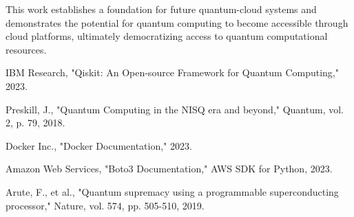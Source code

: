 \documentclass[conference]{IEEEtran}
\begin{document}
This work establishes a foundation for future quantum-cloud systems and demonstrates the potential for quantum computing to become accessible through cloud platforms, ultimately democratizing access to quantum computational resources.



\begin{thebibliography}{9}

IBM Research, "Qiskit: An Open-source Framework for Quantum Computing," 2023.

Preskill, J., "Quantum Computing in the NISQ era and beyond," Quantum, vol. 2, p. 79, 2018.

Docker Inc., "Docker Documentation," 2023.

Amazon Web Services, "Boto3 Documentation," AWS SDK for Python, 2023.

Arute, F., et al., "Quantum supremacy using a programmable superconducting processor," Nature, vol. 574, pp. 505-510, 2019.

\end{thebibliography}
\end{document}
